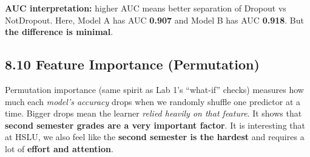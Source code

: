 \documentclass[
]{article}
\begin{document}
\textbf{AUC interpretation:} higher AUC means better separation of
Dropout vs NotDropout. Here, Model A has AUC \textbf{0.907} and Model B
has AUC \textbf{0.918}. But \textbf{the difference is minimal}.

\subsection{8.10 Feature Importance
(Permutation)}\label{feature-importance-permutation}

Permutation importance (same spirit as Lab 1's ``what-if'' checks)
measures how much each \emph{model's accuracy} drops when we randomly
shuffle one predictor at a time. Bigger drops mean the learner
\emph{relied heavily on that feature}. It shows that \textbf{second
semester grades are a very important factor}. It is interesting that at
HSLU, we also feel like the \textbf{second semester is the hardest} and
requires a lot of \textbf{effort and attention}.
\end{document}
